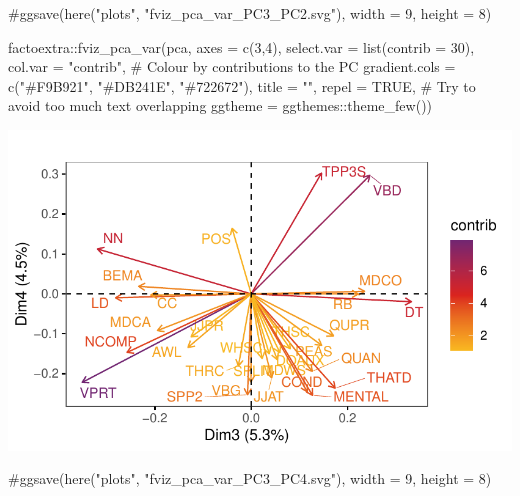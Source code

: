 \documentclass[
  letterpaper,
  DIV=11,
  numbers=noendperiod]{scrreprt}
\newenvironment{Shaded}{\begin{snugshade}}{\end{snugshade}}
\newcommand{\AttributeTok}[1]{\textcolor[rgb]{0.40,0.45,0.13}{#1}}
\newcommand{\CommentTok}[1]{\textcolor[rgb]{0.37,0.37,0.37}{#1}}
\newcommand{\ConstantTok}[1]{\textcolor[rgb]{0.56,0.35,0.01}{#1}}
\newcommand{\DecValTok}[1]{\textcolor[rgb]{0.68,0.00,0.00}{#1}}
\newcommand{\FunctionTok}[1]{\textcolor[rgb]{0.28,0.35,0.67}{#1}}
\newcommand{\NormalTok}[1]{\textcolor[rgb]{0.00,0.23,0.31}{#1}}
\newcommand{\SpecialCharTok}[1]{\textcolor[rgb]{0.37,0.37,0.37}{#1}}
\newcommand{\StringTok}[1]{\textcolor[rgb]{0.13,0.47,0.30}{#1}}
\begin{document}
\begin{Shaded}
\begin{Highlighting}[]
\CommentTok{\#ggsave(here("plots", "fviz\_pca\_var\_PC3\_PC2.svg"), width = 9, height = 8)}

\NormalTok{factoextra}\SpecialCharTok{::}\FunctionTok{fviz\_pca\_var}\NormalTok{(pca,}
             \AttributeTok{axes =} \FunctionTok{c}\NormalTok{(}\DecValTok{3}\NormalTok{,}\DecValTok{4}\NormalTok{),}
             \AttributeTok{select.var =} \FunctionTok{list}\NormalTok{(}\AttributeTok{contrib =} \DecValTok{30}\NormalTok{),}
             \AttributeTok{col.var =} \StringTok{"contrib"}\NormalTok{, }\CommentTok{\# Colour by contributions to the PC}
             \AttributeTok{gradient.cols =} \FunctionTok{c}\NormalTok{(}\StringTok{"\#F9B921"}\NormalTok{, }\StringTok{"\#DB241E"}\NormalTok{, }\StringTok{"\#722672"}\NormalTok{),}
             \AttributeTok{title =} \StringTok{""}\NormalTok{,}
             \AttributeTok{repel =} \ConstantTok{TRUE}\NormalTok{, }\CommentTok{\# Try to avoid too much text overlapping}
             \AttributeTok{ggtheme =}\NormalTok{ ggthemes}\SpecialCharTok{::}\FunctionTok{theme\_few}\NormalTok{())}
\end{Highlighting}
\end{Shaded}

\includegraphics{AppendixF_files/figure-pdf/graphs-of-variables-3.pdf}

\begin{Shaded}
\begin{Highlighting}[]
\CommentTok{\#ggsave(here("plots", "fviz\_pca\_var\_PC3\_PC4.svg"), width = 9, height = 8)}
\end{Highlighting}
\end{Shaded}
\end{document}
